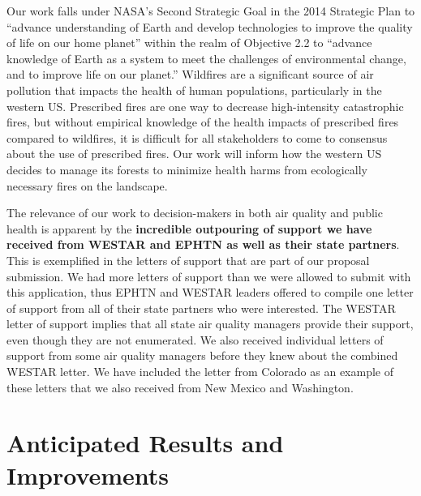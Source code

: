 \documentclass[authoryear]{elsarticle}
\begin{document}
Our work falls under NASA's Second Strategic Goal in the 2014 Strategic Plan to ``advance understanding of Earth and develop technologies to improve the quality of life on our home planet'' within the realm of Objective 2.2 to ``advance knowledge of Earth as a system to meet the challenges of environmental change, and to improve life on our planet.'' Wildfires are a significant source of air pollution that impacts the health of human populations, particularly in the western US. Prescribed fires are one way to decrease high-intensity catastrophic fires, but without empirical knowledge of the health impacts of prescribed fires compared to wildfires, it is difficult for all stakeholders to come to consensus about the use of prescribed fires. 
Our work will inform how the western US decides to manage its forests to minimize health harms from ecologically necessary fires on the landscape. 

The relevance of our work to decision-makers in both air quality and public health is apparent by the \textbf{incredible outpouring of support we have received from WESTAR and EPHTN as well as their state partners}. This is exemplified in the letters of support that are part of our proposal submission. We had more letters of support than we were allowed to submit with this application, thus EPHTN and WESTAR leaders offered to compile one letter of support from all of their state partners who were interested. The WESTAR letter of support implies that all state air quality managers provide their support, even though they are not enumerated. We also received individual letters of support from some air quality managers before they knew about the combined WESTAR letter. We have included the letter from Colorado as an example of these letters that we also received from New Mexico and Washington. 

\section{Anticipated Results and Improvements}
\end{document}
